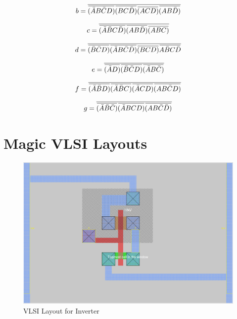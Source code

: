 \documentclass[12pt]{article}
\newcommand{\overbar}[1]{\mkern 1.5mu\overline{\mkern-1.5mu#1\mkern-1.5mu}\mkern 1.5mu} %
\begin{document}
\begin{equation}
b = \overline{\overbar{(\bar{A}B\bar{C}D)}\overbar{(BC\bar{D})}\overbar{(ACD)}\overbar{(AB\bar{D})}}
\end{equation}

\begin{equation}
c = \overline{\overbar{(\bar{A}\bar{B}C\bar{D})}\overbar{(AB\bar{D})}\overbar{(ABC)}}
\end{equation}

\begin{equation}
d = \overline{\overbar{(\bar{B}\bar{C}D)}\overbar{(\bar{A}B\bar{C}\bar{D})}\overbar{(BCD)}\overbar{A\bar{B}C\bar{D}}}
\end{equation}

\begin{equation}
e = \overline{\overbar{(\bar{A}D)}\overbar{(\bar{B}\bar{C}D)}\overbar{(\bar{A}B\bar{C})}}
\end{equation}

\begin{equation}
f = \overline{\overbar{(\bar{A}\bar{B}D)}\overbar{(\bar{A}\bar{B}C)}\overbar{(\bar{A}CD)}\overbar{(AB\bar{C}D)}}
\end{equation}

\begin{equation}
g = \overline{\overbar{(\bar{A}\bar{B}\bar{C})}\overbar{(\bar{A}BCD)}\overbar{(AB\bar{C}\bar{D})}}
\end{equation}

\newpage
\section{Magic VLSI Layouts}
\label{app:magic_vlsi_layouts}

\begin{figure}[H]
	\centering
	\includegraphics[width=0.70\linewidth, keepaspectratio]{Graphics/1INV}
	\caption{VLSI Layout for Inverter}
	\label{fig:magic_inv}
\end{figure}
\end{document}
